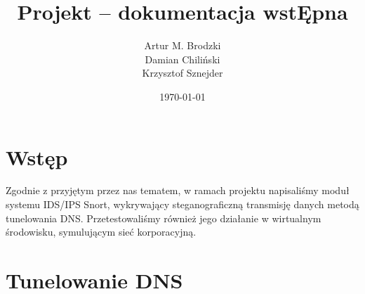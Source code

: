 \documentclass{eiti-raport}
\begin{document}
\author{Artur M. Brodzki \\ Damian Chiliński \\ Krzysztof Sznejder}
\date{\today}
\subject{BCYB 19L}
\title{Projekt -- dokumentacja wstĘpna}

\maketitle


\section{Wstęp} \label{sec:intro}
Zgodnie z przyjętym przez nas tematem, w ramach projektu napisaliśmy moduł systemu IDS/IPS Snort, wykrywający steganograficzną transmisję danych metodą tunelowania DNS. Przetestowaliśmy również jego działanie w wirtualnym środowisku, symulującym sieć korporacyjną. 

\section{Tunelowanie DNS} \label{sec:2}
\end{document}
